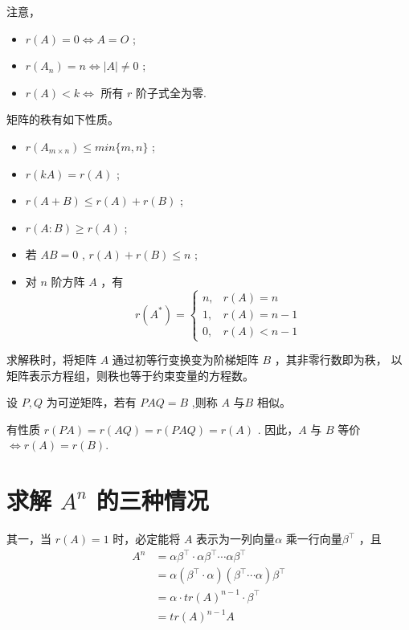 注意，\begin{itemize}
    \item $ r(A) = 0 \Leftrightarrow A = O $ ;
    \item $ r(A_n) = n \Leftrightarrow |A|\neq 0 $ ;
    \item $ r(A)<k \Leftrightarrow $ 所有 $ r $ 阶子式全为零. 
\end{itemize}

矩阵的秩有如下性质。
\begin{itemize}
    \item $ r(A_{m\times n}) \leq min\{m,n\} $ ;
    \item $ r(kA) = r(A) $ ;
    \item $ r(A+B)\leq r(A)+r(B) $ ;
    \item $ r(A:B) \geq r(A) $ ;
    \item 若 $ AB = 0 $ , $ r(A) + r(B) \leq n $ ;
    \item 对 $ n $ 阶方阵 $ A $ ，有$$
        r(A^*)  = \begin{cases}
            n,&r(A) = n\\ 
            1,& r(A) = n-1\\ 
            0,&r(A)< n-1
        \end{cases}
    $$ 
\end{itemize}

求解秩时，将矩阵 $ A $ 通过初等行变换变为阶梯矩阵 $ B $ ，其非零行数即为秩，
以矩阵表示方程组，则秩也等于约束变量的方程数。

设 $ P,Q $ 为可逆矩阵，若有 $ PAQ = B $ ,则称 $ A $ 与$ B $ 相似。

有性质 $ r(PA) = r(AQ) = r(PAQ) = r(A) $ . 因此，$ A $ 与 $ B $ 等价
$ \Leftrightarrow r(A) = r(B) $.

\section{求解 $ A^n $ 的三种情况}

其一，当 $ r(A) = 1 $ 时，必定能将 $ A $ 表示为一列向量$ \alpha $ 乘一行向量$ \beta^\top $ ，且
\begin{equation*}
    \begin{aligned}
        A^n &= \alpha\beta^\top\cdot\alpha\beta^\top\cdots\alpha\beta^\top
        \\&= \alpha(\beta^\top\cdot\alpha)(\beta^\top\cdots\alpha)\beta^\top
        \\&= \alpha\cdot tr(A)^{n-1}\cdot \beta^\top 
        \\&= tr(A)^{n-1}A
    \end{aligned}
\end{equation*}

